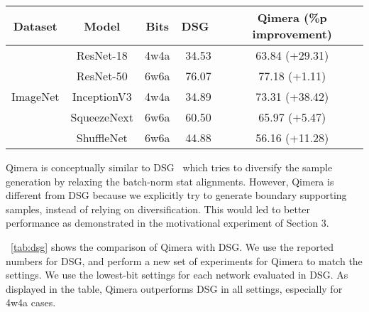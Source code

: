 \documentclass{article}
\newcommand{\aname}{Qimera\xspace}
\begin{document}
{{\begin{table}[h]
{{
    \begin{tabular}{ccccc}
    \toprule
    Dataset & Model & Bits & DSG~\cite{zhang2021diversifying} & Qimera (\%p improvement)\\ 
      \midrule

       \multirow{5}{*}{ImageNet} &   ResNet-18 & 4w4a &	34.53	& 63.84 (+29.31) \\
                                 &   ResNet-50 & 6w6a &	76.07 &	77.18 (+1.11) \\
                                 &   InceptionV3 & 4w4a &	34.89	& 73.31 (+38.42) \\
                                 &   SqueezeNext & 6w6a &	60.50 &	65.97 (+5.47) \\
                                 &   ShuffleNet & 6w6a &	44.88   &	56.16 (+11.28) \\
      
               \bottomrule
          \end{tabular}}
          }
\end{table}

\aname is conceptually similar to DSG~\cite{zhang2021diversifying} which tries to diversify the sample generation by relaxing the batch-norm stat alignments.
However, \aname is different from DSG because we explicitly try to generate boundary supporting samples, instead of relying on diversification.
This would led to better performance as demonstrated in the motivational experiment of Section 3.

\tablename~\ref{tab:dsg} shows the comparison of \aname with DSG.
We use the reported numbers for DSG, and perform a new set of experiments for \aname to match the settings.
We use the lowest-bit settings for each network evaluated in DSG.
As displayed in the table, \aname outperforms DSG in all settings, especially for 4w4a cases.
}





\begin{comment}

\subsection{Applying \aname to ZAQ and AutoReCon}


In this paper, we have applied GDFQ~\cite{gdfq} as a baseline.
However, our design does not particularly depend on a certain method, and can be adopted by many schemes.
Although ZAQ is not a good candidate because it does not utilize conditional generators, we have conducted an experiment of applying \aname to ZAQ~\cite{zaq} and the results are displayed in \tablename~\ref{tab:zaqimera}.
Because original ZAQ does not use per-class sample generation, we have extended the generator with an embedding layer, and added a cross-entropy loss into the loss function as the following:





\end{comment}}
\end{document}
